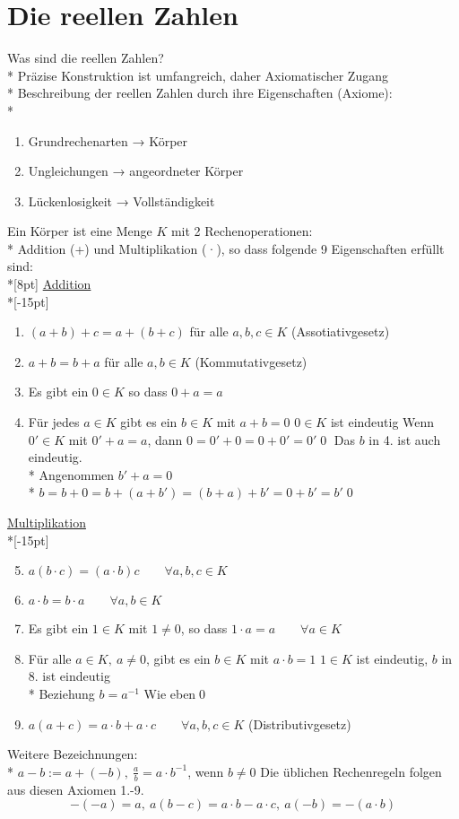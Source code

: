 \chapter{Die reellen Zahlen}
Was sind die reellen Zahlen?\\*
Präzise Konstruktion ist umfangreich, daher Axiomatischer Zugang\\*
Beschreibung der reellen Zahlen durch ihre Eigenschaften (Axiome):\\*
\begin{enumerate}
\item{Grundrechenarten → Körper}
\item{Ungleichungen → angeordneter Körper}
\item{Lückenlosigkeit → Vollständigkeit}
\end{enumerate}
%
\Def
Ein Körper ist eine Menge $K$ mit 2 Rechenoperationen:\\*
Addition (+) und Multiplikation (·), so dass folgende 9 Eigenschaften erfüllt sind:\\*[8pt]
\ul{Addition}\\*[-15pt]
\begin{enumerate}
\item{$(a+b)+c=a+(b+c)$ für alle $a,b,c\in K$ (Assotiativgesetz)}
\item{$a+b=b+a$ für alle $a,b\in K$ (Kommutativgesetz)}
\item{Es gibt ein $0\in K$ so dass $0+a=a$}
\item{Für jedes $a\in K$ gibt es ein $b\in K$ mit $a+b=0$}
\bem
$0\in K$ ist eindeutig
\bew
Wenn $0'\in K$ mit $0'+a=a$, dann $0=0'+0=0+0'=0'$\qed
\bem
Das $b$ in 4. ist auch eindeutig.\\*
\bew
Angenommen $b'+a=0$\\*
$b=b+0=b+(a+b')=(b+a)+b'=0+b'=b'$\qed
\end{enumerate}
\ul{Multiplikation}\\*[-15pt]
\begin{enumerate}
\setcounter{enumi}{4}
\item{$a(b·c)=(a·b)c\qquad ∀a,b,c\in K$}
\item{$a·b=b·a\qquad ∀a,b\in K$}
\item{Es gibt ein $1\in K$ mit $1\neq 0$, so dass $1·a=a\qquad ∀a\in K$}
\item{Für alle $a\in K,\ a\neq 0$, gibt es ein $b\in K$ mit $a·b=1$}
\bem
$1\in K$ ist eindeutig, $b$ in 8. ist eindeutig\\*
Beziehung $b=a^{-1}$
\bew
Wie eben\qed
\item{$a(a+c)=a·b+a·c\qquad ∀a,b,c\in K$ (Distributivgesetz)}
\end{enumerate}
Weitere Bezeichnungen:\\*
$a-b:=a+(-b),\ \frac{a}{b}=a·b^{-1}$, wenn $b≠0$
\bem
Die üblichen Rechenregeln folgen aus diesen Axiomen 1.-9.
\bsp
$$-(-a)=a,\ a(b-c)=a·b-a·c,\ a(-b)=-(a·b)$$

